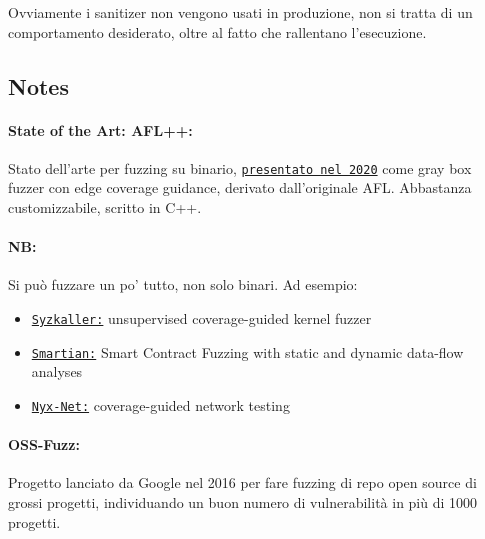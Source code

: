 Ovviamente i sanitizer non vengono usati in produzione, non si tratta di un comportamento desiderato, oltre al fatto che rallentano l'esecuzione.

\vfill

\subsection*{Notes}

\paragraph{State of the Art: AFL++:} Stato dell'arte per fuzzing su binario, \href{https://www.usenix.org/system/files/woot20-paper-fioraldi.pdf}{\texttt{presentato nel 2020}} come gray box fuzzer con edge coverage guidance, derivato dall'originale AFL. Abbastanza customizzabile, scritto in C++. 

\paragraph{NB:} Si può fuzzare un po' tutto, non solo binari. Ad esempio:
\begin{itemize}
	\item \href{https://github.com/google/syzkaller}{\texttt{Syzkaller:}} unsupervised coverage-guided kernel fuzzer

	\item \href{https://softsec.kaist.ac.kr/~sangkilc/papers/choi-ase2021.pdf}{\texttt{Smartian:}} Smart Contract Fuzzing with static and dynamic data-flow analyses

	\item \href{https://dl.acm.org/doi/pdf/10.1145/3492321.3519591}{\texttt{Nyx-Net:}} coverage-guided network testing
\end{itemize}

\paragraph{OSS-Fuzz:} Progetto lanciato da Google nel 2016 per fare fuzzing di repo open source di grossi progetti, individuando un buon numero di vulnerabilità in più di 1000 progetti.

